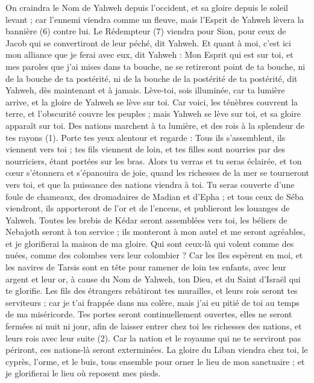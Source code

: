 \begin{multicols}{2}
On craindra le Nom de Yahweh depuis l'occident, et sa gloire depuis le soleil levant ; car l'ennemi viendra comme un fleuve, mais l'Esprit de Yahweh lèvera la bannière (6) contre lui.
Le Rédempteur (7) viendra pour Sion, pour ceux de Jacob qui se convertiront de leur péché, dit Yahweh.
Et quant à moi, c'est ici mon alliance que je ferai avec eux, dit Yahweh : Mon Esprit qui est sur toi, et mes paroles que j'ai mises dans ta bouche, ne se retireront point de ta bouche, ni de la bouche de ta postérité, ni de la bouche de la postérité de ta postérité, dit Yahweh, dès maintenant et à jamais.
\VerseOne{}Lève-toi, sois illuminée, car ta lumière arrive, et la gloire de Yahweh se lève sur toi.
Car voici, les ténèbres couvrent la terre, et l'obscurité couvre les peuples ; mais Yahweh se lève sur toi, et sa gloire apparaît sur toi.
Des nations marchent à ta lumière, et des rois à la splendeur de tes rayons (1).
Porte tes yeux alentour et regarde : Tous ils s’assemblent, ils viennent vers toi ; tes fils viennent de loin, et tes filles sont nourries par des nourriciers, étant portées sur les bras.
Alors tu verras et tu seras éclairée, et ton cœur s'étonnera et s'épanouira de joie, quand les richesses de la mer se tourneront vers toi, et que la puissance des nations viendra à toi.
Tu seras couverte d’une foule de chameaux, des dromadaires de Madian et d'Epha ; et tous ceux de Séba viendront, ils apporteront de l'or et de l'encens, et publieront les louanges de Yahweh.
Toutes les brebis de Kédar seront assemblées vers toi, les béliers de Nebajoth seront à ton service ; ils monteront à mon autel et me seront agréables, et je glorifierai la maison de ma gloire.
Qui sont ceux-là qui volent comme des nuées, comme des colombes vers leur colombier ?
Car les îles espèrent en moi, et les navires de Tarsis sont en tête pour ramener de loin tes enfants, avec leur argent et leur or, à cause du Nom de Yahweh, ton Dieu, et du Saint d'Israël qui te glorifie.
Les fils des étrangers rebâtiront tes murailles, et leurs rois seront tes serviteurs ; car je t'ai frappée dans ma colère, mais j'ai eu pitié de toi au temps de ma miséricorde.
Tes portes seront continuellement ouvertes, elles ne seront fermées ni nuit ni jour, afin de laisser entrer chez toi les richesses des nations, et leurs rois avec leur suite (2).
Car la nation et le royaume qui ne te serviront pas périront, ces nations-là seront exterminées.
La gloire du Liban viendra chez toi, le cyprès, l'orme, et le buis, tous ensemble pour orner le lieu de mon sanctuaire ; et je glorifierai le lieu où reposent mes pieds.

\end{multicols}
